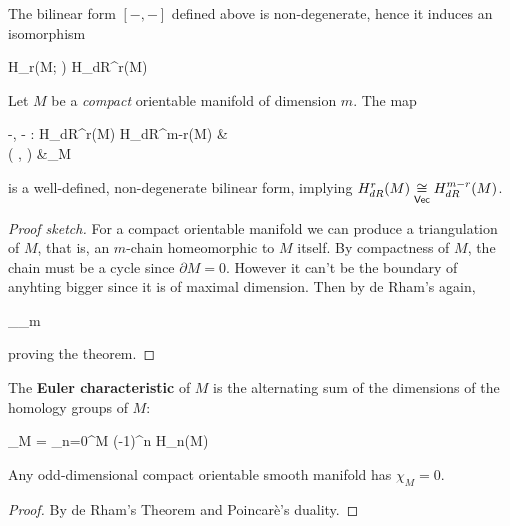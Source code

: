 \documentclass[main.tex]{subfiles}
\begin{document}
\begin{theorem}[de Rham]
\label{th:de_rham}
	The bilinear form $[-,-]$ defined above is non-degenerate, hence it induces an isomorphism
	\begin{eqalign}
		H_r(M; \R) \isoin{\Vec} H_{dR}^r(M)
	\end{eqalign}
\end{theorem}

\begin{theorem}
	Let $M$ be a \emph{compact} orientable manifold of dimension $m$. The map
	\begin{eqalign}
		\langle -, - \rangle : H_{dR}^r(M) \times H_{dR}^{m-r}(M) &\longto \R\\
		( \overline \omega, \overline \eta) &\longmapsto \int_M \omega \wedge \eta
	\end{eqalign}
	is a well-defined, non-degenerate bilinear form, implying $H_{dR}^r(M) \isoin\Vec H_{dR}^{m-r}(M)$.
\end{theorem}
\begin{proof}[Proof sketch]
	For a compact orientable manifold we can produce a triangulation of $M$, that is, an $m$-chain homeomorphic to $M$ itself. By compactness of $M$, the chain must be a cycle since $\partial M = 0$. However it can't be the boundary of anyhting bigger since it is of maximal dimension. Then by de Rham's again,
	\begin{eqalign}
		\int_{\Delta_m} \omega \wedge \eta \neq 0
	\end{eqalign}
	proving the theorem.
\end{proof}

\begin{definition}
	The \textbf{Euler characteristic} of $M$ is the alternating sum of the dimensions of the homology groups of $M$:
	\begin{eqalign}
		\chi_M = \sum_{n=0}^{\dim M} (-1)^n \dim H_n(M)
	\end{eqalign}
\end{definition}

\begin{corollary}
	Any odd-dimensional compact orientable smooth manifold has $\chi_M = 0$.
\end{corollary}
\begin{proof}
	By de Rham's Theorem and Poincarè's duality.
\end{proof}
\end{document}
